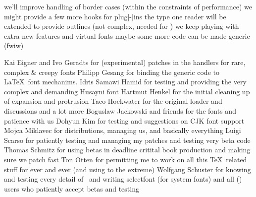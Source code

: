 \stoptitle

\starttitle[title={future}]

    \startitemize
        \startitem
            we'll improve handling of border cases (within the constraints of
            performance)
        \stopitem
        \startitem
            we might provide a few more hooks for plug|-|ins
        \stopitem
        \startitem
            the type one  reader will be extended to provide outlines
            (not complex, needed for \MetaFun)
        \stopitem
        \startitem
            we keep playing with extra new features and virtual fonts
        \stopitem
        \blank
        \startitem
            maybe some more code can be made generic (fwiw)
        \stopitem
    \stopitemize

\stoptitle

\starttitle[title={credits}]

    \startitemize
        \startitem
            Kai Eigner and Ivo Geradts for (experimental) patches in the handlers
            for rare, complex & creepy fonts
        \stopitem
        \startitem
            Philipp Gesang for binding the generic code to \LaTeX\ font mechanims.
        \stopitem
        \startitem
            Idris Samawi Hamid for testing and providing the very complex and
            demanding Husayni font
        \stopitem
        \startitem
            Hartmut Henkel for the initial cleaning up of expansion and protrusion
        \stopitem
        \startitem
            Taco Hoekwater for the original loader and discussions and a lot more
        \stopitem
        \startitem
            Boguslaw Jackowski and friends for the fonts and patience with us
        \stopitem
        \startitem
            Dohyun Kim for testing and suggestions on CJK font support
        \stopitem
        \startitem
            Mojca Miklavec for distributions, managing us, and basically everything
        \stopitem
        \startitem
            Luigi Scarso for patiently testing and managing my patches and testing
            very beta code
        \stopitem
        \startitem
            Thomas Schmitz for using betas in deadline critital book production
            and making sure we patch fast
        \stopitem
        \startitem
            Ton Otten for permitting me to work on all this \TeX\ related stuff for
            ever and ever (and using to the extreme)
        \stopitem
        \startitem
            Wolfgang Schuster for knowing and testing every detail of \ConTeXt\
            and writing selectfont (for system fonts)
        \stopitem
        \blank
        \startitem
            and all (\ConTeXt) users who patiently accept betas and testing
        \stopitem
    \stopitemize

\stoptitle

\stopdocument
